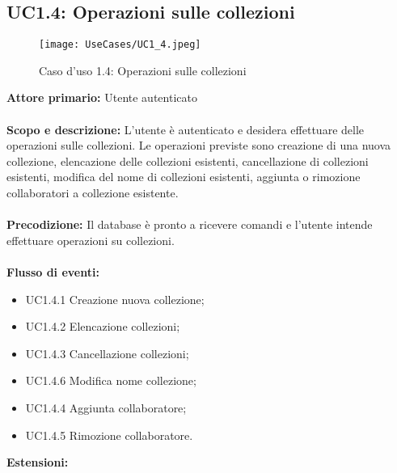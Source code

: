 \documentclass{scalatekids-article}
\begin{document}
\subsection{UC1.4: Operazioni sulle collezioni}
\begin{figure}[H]
  \begin{center}
    \texttt{[image: UseCases/UC1\_4.jpeg]}
    \caption{Caso d'uso 1.4: Operazioni sulle collezioni}
  \end{center}
\end{figure}
\textbf{Attore primario:} Utente autenticato\\ \\
\textbf{Scopo e descrizione:} L'utente è autenticato e desidera effettuare delle operazioni sulle collezioni. Le operazioni previste sono
creazione di una nuova collezione, elencazione delle collezioni esistenti, cancellazione di collezioni esistenti, modifica del nome di collezioni esistenti,
aggiunta o rimozione collaboratori a collezione esistente.\\ \\
\textbf{Precodizione:} Il database è pronto a ricevere comandi e l'utente intende effettuare operazioni su collezioni.\\ \\
\textbf{Flusso di eventi:}
\begin{itemize}
\item UC1.4.1 Creazione nuova collezione;
\item UC1.4.2 Elencazione collezioni;
\item UC1.4.3 Cancellazione collezioni;
\item UC1.4.6 Modifica nome collezione;
\item UC1.4.4 Aggiunta collaboratore;
\item UC1.4.5 Rimozione collaboratore.
\end{itemize}
\textbf{Estensioni:}
\end{document}
